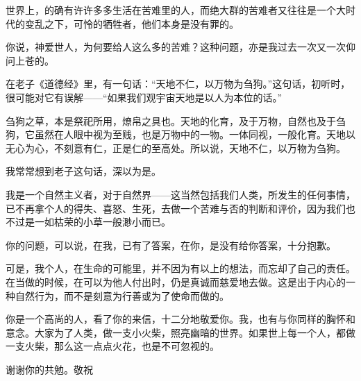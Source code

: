 \par {}
\par 世界上，的确有许许多多生活在苦难里的人，而绝大群的苦难者又往往是一个大时代的变乱之下，可怜的牺牲者，他们本身是没有罪的。
\par 你说，神爱世人，为何要给人这么多的苦难？这种问题，亦是我过去一次又一次仰问上苍的。
\par 在老子《道德经》里，有一句话：“天地不仁，以万物为刍狗。”这句话，初听时，很可能对它有误解——“如果我们观宇宙天地是以人为本位的话。”
\par 刍狗之草，本是祭祀所用，燎帛之具也。天地的化育，及于万物，自然也及于刍狗，它虽然在人眼中视为至贱，也是万物中的一物。一体同视，一般化育。天地以无心为心，不刻意有仁，正是仁的至高处。所以说，天地不仁，以万物为刍狗。
\par 我常常想到老子这句话，深以为是。
\par 我是一个自然主义者，对于自然界——这当然包括我们人类，所发生的任何事情，已不再拿个人的得失、喜怒、生死，去做一个苦难与否的判断和评价，因为我们也不过是一如枯荣的小草一般渺小而已。
\par 你的问题，可以说，在我，已有了答案，在你，是没有给你答案，十分抱歉。
\par 可是，我个人，在生命的可能里，并不因为有以上的想法，而忘却了自己的责任。在当做的时候，在可以为他人付出时，仍是真诚而慈爱地去做。这是出于内心的一种自然行为，而不是刻意为行善或为了使命而做的。
\par 你是一个高尚的人，看了你的来信，十二分地敬爱你。我，也有与你同样的胸怀和意念。大家为了人类，做一支小火柴，照亮幽暗的世界。如果世上每一个人，都做一支火柴，那么这一点点火花，也是不可忽视的。
\par 谢谢你的共勉。敬祝
\par {}
\par {}


\subsubsection{}




\subsubsection{}




\subsubsection{}




